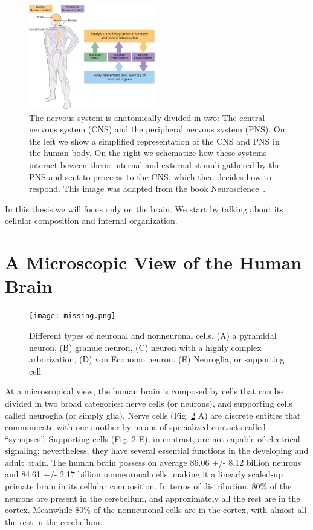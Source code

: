 \begin{figure}[h]
    \includegraphics[width=0.49\textwidth]{2.neuroanatomy/img/pns_and_cns.png}
    \caption{The nervous system is anatomically divided in two: The central
             nervous system (CNS) and the peripheral nervous system (PNS).
             On the left we show a simplified representation of the CNS and
             PNS in the human body. On the right we schematize how these systems
             interact beween them: internal and external stimuli gathered by
             the PNS and sent to proccess to the CNS, which then decides how to
             respond. This image was adapted from the book Neuroscience~\cite{Johns}.}
    \label{fig:cns_and_pns}
\end{figure}  

In this thesis we will focus only on the brain. We start by talking about its
cellular composition and internal organization.

\section{A Microscopic View of the Human Brain}

\begin{figure}[h!]
    \texttt{[image: missing.png]}
    \caption{Different types of neuronal and nonneuronal cells. (A) a pyramidal
             neuron, (B) granule neuron, (C) neuron with a highly complex
             arborization, (D) von Economo neuron. (E) Neuroglia, or supporting cell }
    \label{fig:neuron_types}
\end{figure}

At a microscopical view, the human brain is composed by cells that can be
divided in two broad categories: nerve cells (or neurons), and supporting cells
called neuroglia (or simply glia). Nerve cells (Fig. \ref{fig:neuron_types} A)
are discrete entities that communicate with one another by means of specialized
contacts called “synapses”\cite{Purves2004}. Supporting cells (Fig. \ref{fig:neuron_types} E),
in contrast, are not capable of electrical signaling; nevertheless,
they have several essential functions in the developing and adult brain. The
human brain possess on average 86.06 +/- 8.12 billion neurons and
84.61 +/- 2.17 billion nonneuronal cells, making it a linearly scaled-up primate
brain in its cellular composition. In terms of distribution, 80\% of the neurons
are present in the cerebellum, and approximately all the rest are in the cortex.
Meanwhile 80\% of the nonneuronal cells are in the cortex, with almost all the
rest in the cerebellum.

